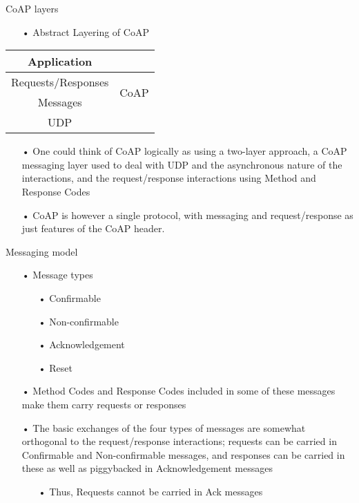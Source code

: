 \documentclass[11pt]{beamer}
\begin{document}
\begin{frame}{CoAP layers}
\begin{itemize}
\item[•] Abstract Layering of CoAP
\end{itemize}
\begin{center}
  \begin{tabular}{ | c | c }
    \cline{1-0}
    Application &  \\ \cline{1-0} \hline
    Requests/Responses & \multirow{2}{*}{CoAP}  \\ \cline{1-0} 
    Messages &  \\ \cline{1-0} \hline
    UDP &  \\
    \cline{1-0}
  \end{tabular}
\end{center}
\begin{itemize}
\item[•] One could think of CoAP logically as using a two-layer approach, a CoAP messaging layer used to deal with UDP and the asynchronous nature of the interactions, and the request/response interactions using Method and Response Codes
\item[•] CoAP is however a single protocol, with messaging and request/response as just features
   of the CoAP header.
\end{itemize}
\end{frame}
\begin{frame}{Messaging model}
\begin{itemize}
\item[•] Message types
\begin{itemize}
\item[•] Confirmable
\item[•] Non-confirmable
\item[•] Acknowledgement
\item[•] Reset
\end{itemize}
\item[•] Method Codes and Response Codes included in some of these messages make them carry requests or responses
\item[•] The basic exchanges of the four types of messages are somewhat orthogonal to the request/response interactions; requests can be carried in Confirmable and Non-confirmable messages, and responses can be carried in these as well as piggybacked in Acknowledgement messages
\begin{itemize}
\item[•] Thus, Requests cannot be carried in Ack messages
\end{itemize}
\end{itemize}
\end{frame}
\end{document}
